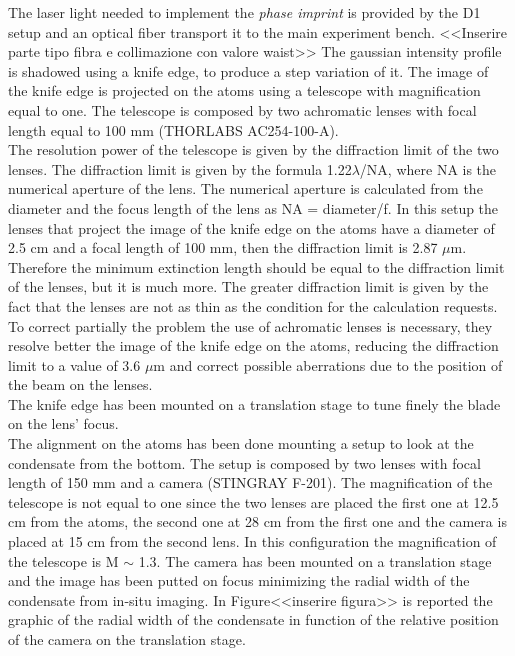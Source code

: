 \documentclass[../thesis.tex]{subfiles}
\begin{document}
The laser light needed to implement the \textit{phase imprint} is provided by the D1 setup and an optical fiber transport it to the main experiment bench. <<Inserire parte tipo fibra e collimazione con valore waist>> The gaussian intensity profile is shadowed using a knife edge, to produce a step variation of it. The image of the knife edge is projected on the atoms using a telescope with magnification equal to one. The telescope is composed by two achromatic lenses with focal length equal to 100 mm (THORLABS AC254-100-A).\\
The resolution power of the telescope is given by the diffraction limit of the two lenses. The diffraction limit is given by the formula 1.22$\lambda$/NA, where NA is the numerical aperture of the lens. The numerical aperture is calculated from the diameter and the focus length of the lens as NA = diameter/f. In this setup the lenses that project the image of the knife edge on the atoms have a diameter of 2.5 cm and a focal length of 100 mm, then the diffraction limit is 2.87 $\mu$m. Therefore the minimum extinction length should be equal to the diffraction limit of the lenses, but it is much more. The greater diffraction limit is given by the fact that the lenses are not as thin as the condition for the calculation requests.  To correct partially the problem the use of achromatic lenses is necessary, they resolve better the image of the knife edge on the atoms, reducing the diffraction limit to a value of 3.6 $\mu$m and correct possible aberrations due to the position of the beam on the lenses.\\
The knife edge has been mounted on a translation stage to tune finely the blade on the lens' focus.\\

The alignment on the atoms has been done mounting a setup to look at the condensate from the bottom. The setup is composed by two lenses with focal length of 150 mm and a camera (STINGRAY F-201). The magnification of the telescope is not equal to one since the two lenses are placed the first one at 12.5 cm from the atoms, the second one at 28 cm from the first one and the camera is placed at 15 cm from the second lens. In this configuration the magnification of the telescope is M $\sim$ 1.3. The camera has been mounted on a translation stage and the image has been putted on focus minimizing the radial width of the condensate from in-situ imaging. In Figure<<inserire figura>> is reported the graphic of the radial width of the condensate in function of the relative position of the camera on the translation stage.\\
\end{document}
